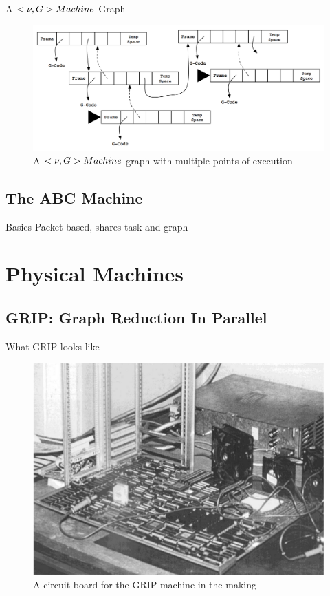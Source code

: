 \documentclass{beamer}
\begin{document}
\begin{frame}{A $<\nu, G>\-Machine$ Graph}
    \begin{figure}
    \centering
        \includegraphics[scale=.4]{figures/vGraph.png}
        \caption{A $<\nu, G>\-Machine$ graph with multiple points of execution}
    \end{figure}
\end{frame}

\subsection[The ABC Machines]{The ABC Machine}
\begin{frame}{Basics}
Packet based, shares task and graph
\end{frame}

\section{Physical Machines}

\subsection[GRIP]{GRIP: Graph Reduction In Parallel}
\begin{frame}[fragile]{What GRIP looks like}{}

\begin{figure}[h]
 \centering
 \includegraphics[scale=.4]{figures/GRIP.png}
 \caption{A circuit board for the GRIP machine in the making \citep{PFPAnIntro}}
\end{figure}
\end{frame}
\end{document}
